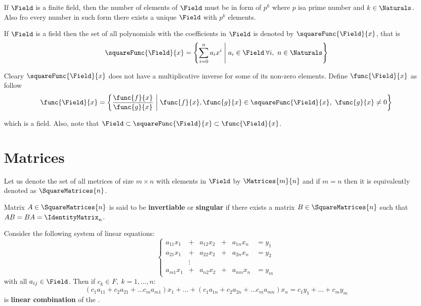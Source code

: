 \begin{theorem}
    If \(\Field\) is a finite field, then the number of elements of \(\Field\) must be in form of \(p^k\) where \(p\) isa prime number and \(k \in \Naturals\). Also fro every number in such form there exists a unique \(\Field\) with \(p^k\) elements.
\end{theorem}

If \(\Field\) is a field then the set of all polynomials with the coefficients in \(\Field\) is denoted by \(\squareFunc{\Field}{x}\), that is
\begin{equation*}
    \squareFunc{\Field}{x} = \left\{ \sum_{i = 0}^{n} a_i x^i \; \middle| \; a_i \in \Field \: \forall i,\ n \in \Naturals \right\}
\end{equation*}

Cleary \(\squareFunc{\Field}{x}\) does not have a multiplicative inverse for some of its non-zero elements. Define \(\func{\Field}{x}\) as follow
\begin{equation*}
    \func{\Field}{x} = \left\{ \frac{\func{f}{x}}{\func{g}{x}} \; \middle| \; \func{f}{x}, \func{g}{x} \in \squareFunc{\Field}{x}, \  \func{g}{x} \neq 0 \right\}
\end{equation*}

which is a field. Also, note that \(\Field \subset \squareFunc{\Field}{x} \subset \func{\Field}{x}\).
\section{Matrices}
Let us denote the set of all metrices of size \(m \times n\) with elements in \(\Field\) by \( \Matrices{m}{n} \) and if \(m = n\) then it is equivalently denoted as \(\SquareMatrices{n}\).

Matrix \(A \in \SquareMatrices{n}\) is said to be \textbf{invertiable} or \textbf{singular} if there exists a matrix \(B \in \SquareMatrices{n}\) such that \(AB = BA = \IdentityMatrix_n\).

Consider the following system of linear equations:
\begin{equation}
    \left\{
    \begin{alignedat}{3} \label{eq:LinearEquation}
        a_{11}x_1 & +{} &  a_{12}x_2 & +{} & a_{1n}x_n & = y_1 \\
        a_{21}x_1 & +{} &  a_{22}x_2 & +{} & a_{2n}x_n & = y_2 \\
        & \vdots\\
        a_{m1}x_1 & +{} &  a_{n2}x_2 & +{} & a_{mn}x_n & = y_m
    \end{alignedat}
    \right.
\end{equation}
with all \(a_{ij} \in \Field\). Then if \(c_k \in F,\; k = 1, \dots, n\):
\begin{equation*}
    (c_1 a_{11} + c_2 a_{21} + \dots c_m a_{m1})x_1 + \dots + (c_1 a_{1n} + c_2 a_{2n} + \dots c_m a_{mn})x_n = c_1 y_1 + \dots + c_m y_m
\end{equation*}
is \textbf{linear combination} of the .

